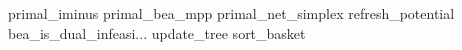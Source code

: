 primal_iminus
primal_bea_mpp
primal_net_simplex
refresh_potential
bea_is_dual_infeasi...
update_tree
sort_basket
